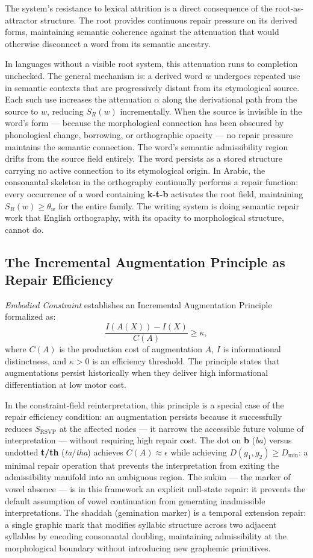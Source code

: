 \documentclass[11pt, a4paper]{article}
\theoremstyle{definition}
\theoremstyle{remark}
\begin{document}
The system's resistance to lexical attrition is a direct consequence of the
root-as-attractor structure. The root provides continuous repair pressure on
its derived forms, maintaining semantic coherence against the attenuation that
would otherwise disconnect a word from its semantic ancestry.

In languages without a visible root system, this attenuation runs to
completion unchecked. The general mechanism is: a derived word $w$ undergoes
repeated use in semantic contexts that are progressively distant from its
etymological source. Each such use increases the attenuation $\alpha$ along
the derivational path from the source to $w$, reducing $S_R(w)$ incrementally.
When the source is invisible in the word's form --- because the morphological
connection has been obscured by phonological change, borrowing, or
orthographic opacity --- no repair pressure maintains the semantic connection.
The word's semantic admissibility region drifts from the source field entirely.
The word persists as a stored structure carrying no active connection to its
etymological origin. In Arabic, the consonantal skeleton in the orthography
continually performs a repair function: every occurrence of a word containing
\textbf{k-t-b} activates the root field, maintaining $S_R(w) \geq \theta_w$
for the entire family. The writing system is doing semantic repair work that
English orthography, with its opacity to morphological structure, cannot do.

\subsection{The Incremental Augmentation Principle as Repair Efficiency}

\textit{Embodied Constraint} establishes an Incremental Augmentation Principle
formalized as:
\[
\frac{I(A(X)) - I(X)}{C(A)} \geq \kappa,
\]
where $C(A)$ is the production cost of augmentation $A$, $I$ is informational
distinctness, and $\kappa > 0$ is an efficiency threshold. The principle
states that augmentations persist historically when they deliver high
informational differentiation at low motor cost.

In the constraint-field reinterpretation, this principle is a special case
of the repair efficiency condition: an augmentation persists because it
successfully reduces $S_{\mathrm{RSVP}}$ at the affected nodes --- it
narrows the accessible future volume of interpretation --- without requiring
high repair cost. The dot on \textbf{b} (\textit{ba}) versus undotted
\textbf{t/th} (\textit{ta}/\textit{tha}) achieves $C(A) \approx \epsilon$
while achieving $D(g_1, g_2) \geq D_{\min}$: a minimal repair operation
that prevents the interpretation from exiting the admissibility manifold
into an ambiguous region. The sukūn --- the marker of vowel absence ---
is in this framework an explicit null-state repair: it prevents the default
assumption of vowel continuation from generating inadmissible interpretations.
The shaddah (gemination marker) is a temporal extension repair: a single
graphic mark that modifies syllabic structure across two adjacent syllables
by encoding consonantal doubling, maintaining admissibility at the morphological
boundary without introducing new graphemic primitives.
\end{document}
